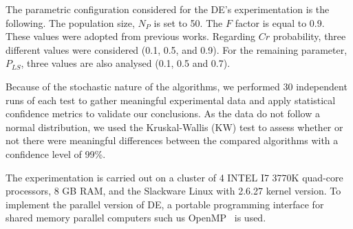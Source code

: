 The parametric configuration considered for the DE's experimentation is the following. The population size, $N_P$ is set to 50. The $F$ factor is equal to 0.9. These values were adopted from previous works. Regarding $Cr$ probability, three different values were considered (0.1, 0.5, and 0.9). For the remaining parameter, $P_{LS}$, three values are also analysed (0.1, 0.5 and 0.7).   %
%
%
%

Because of the stochastic nature of the algorithms, we performed 30 independent runs of each test to gather meaningful experimental data and apply statistical confidence metrics to validate our conclusions. %
As the data do not follow a normal distribution, we used the Kruskal-Wallis (KW) test to assess whether or not there were meaningful differences between the compared algorithms with a confidence level of 99\%.

The experimentation is carried out on a cluster of 4 INTEL I7 3770K quad-core processors, 8 GB RAM, and the Slackware Linux with 2.6.27 kernel version. To implement the parallel version of DE, a portable programming interface for shared memory parallel computers such us OpenMP~\cite{openMP} is used.